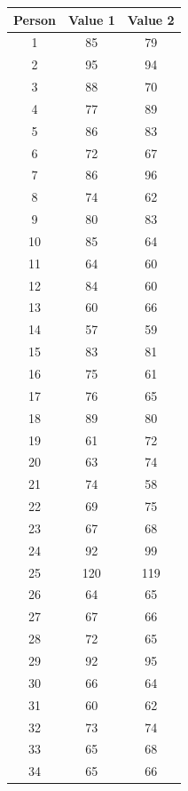 \documentclass[11pt,a4paper]{article}
\begin{document}
\begin{center}
    \begin{longtable}{|c|c|c|}
        \hline
        \textbf{Person} & \textbf{Value 1} & \textbf{Value 2} \\
        \hline\hline
        1 & 85 & 79 \\\hline
        2 & 95 & 94 \\\hline
        3 & 88 & 70 \\\hline
        4 & 77 & 89 \\\hline
        5 & 86 & 83 \\\hline
        6 & 72 & 67 \\\hline
        7 & 86 & 96 \\\hline
        8 & 74 & 62 \\\hline
        9 & 80 & 83 \\\hline
        10 & 85 & 64 \\\hline
        11 & 64 & 60 \\\hline
        12 & 84 & 60 \\\hline
        13 & 60 & 66 \\\hline
        14 & 57 & 59 \\\hline
        15 & 83 & 81 \\\hline
        16 & 75 & 61 \\\hline
        17 & 76 & 65 \\\hline
        18 & 89 & 80 \\\hline
        19 & 61 & 72 \\\hline
        20 & 63 & 74 \\\hline
        21 & 74 & 58 \\\hline
        22 & 69 & 75 \\\hline
        23 & 67 & 68 \\\hline
        24 & 92 & 99 \\\hline
        25 & 120 & 119 \\\hline
        26 & 64 & 65 \\\hline
        27 & 67 & 66 \\\hline
        28 & 72 & 65 \\\hline
        29 & 92 & 95 \\\hline
        30 & 66 & 64 \\\hline
        31 & 60 & 62 \\\hline
        32 & 73 & 74 \\\hline
        33 & 65 & 68 \\\hline
        34 & 65 & 66 \\\hline

\end{longtable}
\end{center}
\end{document}
